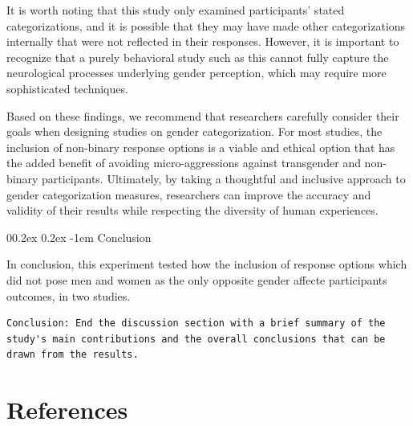 \documentclass[
  man]{apa7}
\makeatletter
\let\oldparagraph\paragraph
\renewcommand{\paragraph}[1]{\oldparagraph{#1}\mbox{}}
\renewcommand{\paragraph}{\@startsection{paragraph}{4}{\parindent}%
  {0\baselineskip \@plus 0.2ex \@minus 0.2ex}%
  {-1em}%
  {\normalfont\normalsize\bfseries\itshape\typesectitle}}
\renewcommand{\paragraph}{\@startsection{paragraph}{4}{\parindent}%
  {0\baselineskip \@plus 0.2ex \@minus 0.2ex}%
  {-1em}%
  {\normalfont\normalsize\bfseries\typesectitle}}
\makeatother
\begin{document}
It is worth noting that this study only examined participants' stated categorizations, and it is possible that they may have made other categorizations internally that were not reflected in their responses. However, it is important to recognize that a purely behavioral study such as this cannot fully capture the neurological processes underlying gender perception, which may require more sophisticated techniques.

Based on these findings, we recommend that researchers carefully consider their goals when designing studies on gender categorization. For most studies, the inclusion of non-binary response options is a viable and ethical option that has the added benefit of avoiding micro-aggressions against transgender and non-binary participants. Ultimately, by taking a thoughtful and inclusive approach to gender categorization measures, researchers can improve the accuracy and validity of their results while respecting the diversity of human experiences.

\hypertarget{conclusion}{%
\paragraph{Conclusion}\label{conclusion}}

In conclusion, this experiment tested how the inclusion of response options which did not pose men and women as the only opposite gender affecte participants outcomes, in two studies.

\begin{verbatim}
Conclusion: End the discussion section with a brief summary of the study's main contributions and the overall conclusions that can be drawn from the results.
\end{verbatim}

\newpage

\hypertarget{references}{%
\section{References}\label{references}}
\end{document}
